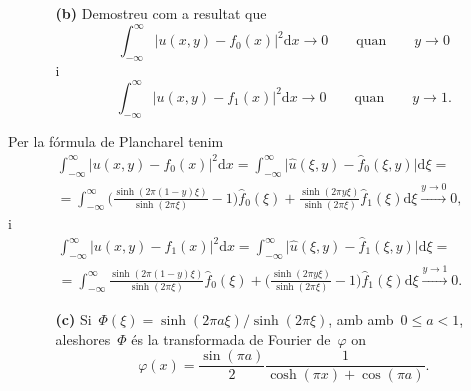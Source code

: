 \documentclass[a4paper]{article}
\theoremstyle{plain}
\theoremstyle{definition}
\providecommand{\uppi}{\pi}
\newcommand{\diff}{\mathrm{d}}
\newcommand{\abs}[1]{\lvert{#1}\rvert}
\begin{document}
\begin{enumerate}
    \item[]\begin{enumerate}
        \item[\textbf{(b)}] Demostreu com a resultat que
            \[
                \int_{-\infty}^{\infty}
                \abs{u(x,y) - f_{0}(x)}^{2}
                \diff x
                \to 0
                \qquad\text{quan}\qquad
                y\to 0
            \]
            i
            \[
                \int_{-\infty}^{\infty}
                \abs{u(x,y) - f_{1}(x)}^{2}
                \diff x
                \to 0
                \qquad\text{quan}\qquad
                y\to 1.
            \]
    \end{enumerate}
\end{enumerate}

Per la fórmula de Plancharel tenim
\begin{multline*}
    \int_{-\infty}^{\infty}
    \abs{u(x,y)-f_{0}(x)}^{2}
    \diff x
    =
    \int_{-\infty}^{\infty}
    \abs{\widehat{u}(\xi,y)-\widehat{f}_{0}(\xi,y)}
    \diff\xi
    = \\ =
    \int_{-\infty}^{\infty}
    \biggl(\frac{\sinh(2\uppi(1-y)\xi)}{\sinh(2\uppi\xi)}-1\biggr)
    \widehat{f}_{0}(\xi)
    +
    \frac{\sinh(2\uppi y\xi)}{\sinh(2\uppi\xi)}
    \widehat{f}_{1}(\xi)
    \diff\xi
    \overset{y\to 0}{\longrightarrow} 0,
\end{multline*}
i
\begin{multline*}
    \int_{-\infty}^{\infty}
    \abs{u(x,y)-f_{1}(x)}^{2}
    \diff x
    =
    \int_{-\infty}^{\infty}
    \abs{\widehat{u}(\xi,y)-\widehat{f}_{1}(\xi,y)}
    \diff\xi
    = \\ =
    \int_{-\infty}^{\infty}
    \frac{\sinh(2\uppi(1-y)\xi)}{\sinh(2\uppi\xi)}
    \widehat{f}_{0}(\xi)
    +
    \biggl(\frac{\sinh(2\uppi y\xi)}{\sinh(2\uppi\xi)}-1\biggr)
    \widehat{f}_{1}(\xi)
    \diff\xi
    \overset{y\to 1}{\longrightarrow} 0.
\end{multline*}

\begin{enumerate}
    \item[]\begin{enumerate}
        \item[\textbf{(c)}] Si~\(\Phi(\xi)=\sinh(2\uppi a\xi)/\sinh(2\uppi\xi)\), amb
            amb~\(0\leq a<1\), aleshores~\(\Phi\) és la transformada de Fourier
            de~\(\varphi\) on
            \[
                \varphi(x)
                = \frac{\sin(\uppi a)}{2}
                \frac{1}{\cosh(\uppi x) + \cos(\uppi a)}.
            \]
    \end{enumerate}
\end{enumerate}
\end{document}
